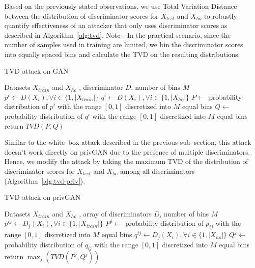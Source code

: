 \documentclass{article}
\begin{document}
Based on the previously stated observations, we use Total Variation Distance between the distribution of discriminator scores for $X_{test}$ and $X_{ho}$ to robustly quantify effectiveness of an attacker that only uses discriminator scores as described in Algorithm~\ref{alg:tvd}. Note - In the practical scenario, since the number of samples used in training are limited, we bin the discriminator scores into equally spaced bins and calculate the TVD on the resulting distributions. 

\begin{algorithm}
   \caption{TVD attack on GAN}
   \label{alg:tvd}
\begin{algorithmic}
    Datasets $X_{train}$ and $X_{ho}$ , discriminator $D$, number of bins $M$
   \STATE $p^i \leftarrow D(X_i), \forall i \in \{1,|X_{train}|\}$
   \STATE $q^i \leftarrow D(X_i), \forall i \in \{1,|X_{ho}|\}$
   \STATE $P \leftarrow$ probability distribution of $p^i$ with the range $[0,1]$ discretized into $M$ equal bins
   \STATE $Q \leftarrow$ probability distribution of $q^i$ with the range $[0,1]$ discretized into $M$ equal bins   
   \STATE return $TVD(P,Q)$
\end{algorithmic}
\end{algorithm}

Similar to the white--box attack described in the previous sub--section, this attack doesn't work directly on privGAN due to the presence of multiple discriminators. Hence, we modify the attack by taking the maximum TVD of the distribution of discriminator scores for $X_{test}$ and $X_{ho}$ among all discriminators (Algorithm~\ref{alg:tvd-priv}). 

\begin{algorithm}
   \caption{TVD attack on privGAN}
   \label{alg:tvd-priv}
\begin{algorithmic}
    Datasets $X_{train}$ and $X_{ho}$ , array of discriminators $D$, number of bins $M$
   \STATE $p^{ij} \leftarrow D_j(X_i), \forall i \in \{1,|X_{train}|\}$
   \STATE $P^j \leftarrow$ probability distribution of $p_{ij}$ with the range $[0,1]$ discretized into $M$ equal bins
   \STATE $q^{ij} \leftarrow D_j(X_i), \forall i \in \{1,|X_{ho}|\}$
   \STATE $Q^j \leftarrow$ probability distribution of $q_{ij}$ with the range $[0,1]$ discretized into $M$ equal bins
   \ENDFOR
   \STATE return $\max_j(TVD(P^j,Q^j))$
\end{algorithmic}
\end{algorithm}
\end{document}
